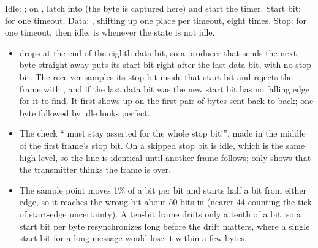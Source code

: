Idle: ; on , latch  into  (the
byte is captured here) and start the timer. Start bit:  for one timeout. Data:
, shifting  up one place per timeout, eight times. Stop:
 for one timeout, then idle.  is  whenever the state is not
idle.
\begin{itemize}
  \item {} drops at the end of the eighth data bit, so a producer that sends the next byte
    straight away puts its start bit right after the last data bit, with no stop bit. The receiver
    samples its stop bit inside that start bit and rejects the frame with , and if
    the last data bit was  the new start bit has no falling edge for it to find. It first
    shows up on the first pair of bytes sent back to back; one byte followed by idle looks perfect.
  \item The check `` must stay asserted for the whole stop bit!'', made in the middle of
    the first frame's stop bit. On  a skipped stop bit is idle, which is the same high
    level, so the line is identical until another frame follows; only  shows that the
    transmitter thinks the frame is over.
  \item The sample point moves 1\% of a bit per bit and starts half a bit from either edge, so it
    reaches the wrong bit about 50 bits in (nearer 44 counting the tick of start-edge uncertainty).
    A ten-bit frame drifts only a tenth of a bit, so a start bit per byte resynchronizes long before
    the drift matters, where a single start bit for a long message would lose it within a few
    bytes.
\end{itemize}
